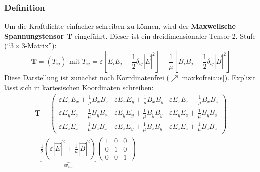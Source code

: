   \subsubsection{Definition}
         Um die Kraftdichte einfacher schreiben zu können, wird der \textbf{Maxwellsche Spannungstensor} \(\mathbf{T}\) eingeführt. Dieser ist ein dreidimensionaler Tensor 2. Stufe (\enquote{\(3 \times 3\)-Matrix}):
              \begin{equation}\label{maxkofrei}
	              \mathbf{T} = \left(T_{ij}\right) \text{ mit } \boxed{T_{ij} = \varepsilon\left[ E_iE_j-\frac{1}{2}\delta_{ij} |\vec{E}|^2\right] + \frac{1}{\mu} \left[B_iB_j-\frac{1}{2}\delta_{ij} |\vec{B} |^2\right] } 
              \end{equation}
         Diese Darstellung ist zunächst noch Korrdinatenfrei ($\nearrow$\ref{maxkofreiaus}). Explizit lässt sich in kartesischen Koordinaten schreiben:
              \begin{equation}
	              \begin{split}
		              \mathbf{T} =
		              \begin{pmatrix}
			              \varepsilon E_xE_x + \frac{1}{\mu}B_xB_x & \varepsilon E_xE_y + \frac{1}{\mu}B_xB_y & \varepsilon E_xE_z + \frac{1}{\mu}B_xB_z \\
			              \varepsilon E_yE_x + \frac{1}{\mu}B_yB_x & \varepsilon E_yE_y + \frac{1}{\mu}B_yB_y & \varepsilon E_yE_z + \frac{1}{\mu}B_yB_z \\
			              \varepsilon E_zE_x + \frac{1}{\mu}B_zB_x & \varepsilon E_zE_y + \frac{1}{\mu}B_zB_y & \varepsilon E_zE_z + \frac{1}{\mu}B_zB_z
		              \end{pmatrix}
		              \\ -\underbrace{\frac{1}{2}\left(\varepsilon |\vec{E}|^2 + \frac{1}{\mu}|\vec{B} |^2\right)}_{w_\text{em}}
		              \begin{pmatrix}
			              1 & 0 & 0 \\
			              0 & 1 & 0 \\
			              0 & 0 & 1
		              \end{pmatrix}
	              \end{split}
              \end{equation}
